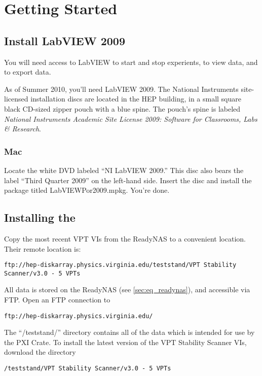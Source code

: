 \section{Getting Started}
\label{sec:op_start}

\subsection{Install LabVIEW 2009}
You will need access to \gls{LabVIEW} to start and stop experients, to view data, and to export data.

As of Summer 2010, you'll need \gls{LabVIEW} 2009.  The National Instruments site-licensed installation discs are located in the HEP building, in a small square black CD-sized zipper pouch with a blue spine.  The pouch's spine is labeled \textit{National Instruments Academic Site License 2009: Software for Classrooms, Labs \& Research}.

\subsubsection{Mac}
\label{sec:LabViewMacLinux}

Locate the white DVD labeled ``NI LabVIEW 2009.''  This disc also bears the label ``Third Quarter 2009'' on the left-hand side.  Insert the disc and install the package titled LabVIEWPor2009.mpkg.  You're done.

\subsection{Installing the }

Copy the most recent \glspl{VPT VI} from the ReadyNAS to a convenient location.  Their remote location is:
\begin{verbatim}
ftp://hep-diskarray.physics.virginia.edu/teststand/VPT Stability Scanner/v3.0 - 5 VPTs
\end{verbatim} \noindent

All data is stored on the ReadyNAS (see \ref{sec:eq_readynas}), and accessible via FTP.  Open an FTP connection to
\begin{verbatim}
ftp://hep-diskarray.physics.virginia.edu/
\end{verbatim} \noindent

The ``/teststand/'' directory contains all of the data which is intended for use by the \gls{PXI Crate}.  To install the latest version of the VPT Stability Scanner VIs, download the directory 
\begin{verbatim}
/teststand/VPT Stability Scanner/v3.0 - 5 VPTs
\end{verbatim} \noindent

